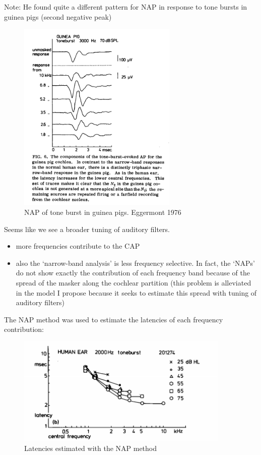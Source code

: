 \documentclass[]{article}
\providecommand{\tightlist}{%
  \setlength{\itemsep}{0pt}\setlength{\parskip}{0pt}}
\begin{document}
\clearpage

Note: He found quite a different pattern for NAP in response to tone
bursts in guinea pigs (second negative peak)

\begin{figure}
\centering
\includegraphics[width=3.00000in]{./figures/NAP_tone_guinea.png}
\caption{NAP of tone burst in guinea pigs. Eggermont 1976}
\end{figure}

Seems like we see a broader tuning of auditory filters.

\begin{itemize}
\tightlist
\item
  more frequencies contribute to the CAP
\item
  also the `narrow-band analysis' is less frequency selective. In fact,
  the `NAPs' do not show exactly the contribution of each frequency band
  because of the spread of the masker along the cochlear partition (this
  problem is alleviated in the model I propose because it seeks to
  estimate this spread with tuning of auditory filters)
\end{itemize}

\clearpage

The NAP method was used to estimate the latencies of each frequency
contribution:

\begin{figure}
\centering
\includegraphics[width=4.00000in]{./figures/NAP_tone_latencies.png}
\caption{Latencies estimated with the NAP method}
\end{figure}
\end{document}
